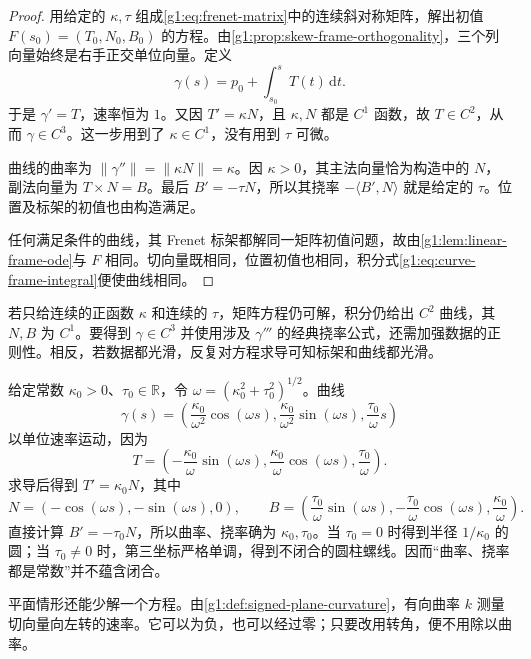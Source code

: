 \begin{proof}
	用给定的 \(\kappa,\tau\) 组成\eqref{g1:eq:frenet-matrix}中的连续斜对称矩阵，解出初值 \(F(s_0)=(T_0,N_0,B_0)\) 的方程。由\cref{g1:prop:skew-frame-orthogonality}，三个列向量始终是右手正交单位向量。定义
	\begin{equation}
		\label{g1:eq:curve-frame-integral}
		\gamma(s)=p_0+\int_{s_0}^s T(t)\,\mathrm{d}t.
	\end{equation}
	于是 \(\gamma'=T\)，速率恒为 \(1\)。又因 \(T'=\kappa N\)，且 \(\kappa,N\) 都是 \(C^1\) 函数，故 \(T\in C^2\)，从而 \(\gamma\in C^3\)。这一步用到了 \(\kappa\in C^1\)，没有用到 \(\tau\) 可微。

	曲线的曲率为 \(\lVert\gamma''\rVert=\lVert\kappa N\rVert=\kappa\)。因 \(\kappa>0\)，其主法向量恰为构造中的 \(N\)，副法向量为 \(T\times N=B\)。最后 \(B'=-\tau N\)，所以其挠率 \(-\langle B',N\rangle\) 就是给定的 \(\tau\)。位置及标架的初值也由构造满足。

	任何满足条件的曲线，其 Frenet 标架都解同一矩阵初值问题，故由\cref{g1:lem:linear-frame-ode}与 \(F\) 相同。切向量既相同，位置初值也相同，积分式\eqref{g1:eq:curve-frame-integral}便使曲线相同。
\end{proof}

若只给连续的正函数 \(\kappa\) 和连续的 \(\tau\)，矩阵方程仍可解，积分仍给出 \(C^2\) 曲线，其 \(N,B\) 为 \(C^1\)。要得到 \(\gamma\in C^3\) 并使用涉及 \(\gamma'''\) 的经典挠率公式，还需加强数据的正则性。相反，若数据都光滑，反复对方程求导可知标架和曲线都光滑。

\begin{example}
	\label{g1:exm:constant-curvature-helix}
	给定常数 \(\kappa_0>0\)、\(\tau_0\in\mathbb R\)，令 \(\omega=(\kappa_0^2+\tau_0^2)^{1/2}\)。曲线
	\[
		\gamma(s)=\left(
			\frac{\kappa_0}{\omega^2}\cos(\omega s),
			\frac{\kappa_0}{\omega^2}\sin(\omega s),
			\frac{\tau_0}{\omega}s
		\right)
	\]
	以单位速率运动，因为
	\[
		T=\left(-\frac{\kappa_0}{\omega}\sin(\omega s),
		\frac{\kappa_0}{\omega}\cos(\omega s),\frac{\tau_0}{\omega}\right).
	\]
	求导后得到 \(T'=\kappa_0N\)，其中
	\[
		N=(-\cos(\omega s),-\sin(\omega s),0),\qquad
		B=\left(\frac{\tau_0}{\omega}\sin(\omega s),
		-\frac{\tau_0}{\omega}\cos(\omega s),\frac{\kappa_0}{\omega}\right).
	\]
	直接计算 \(B'=-\tau_0N\)，所以曲率、挠率确为 \(\kappa_0,\tau_0\)。当 \(\tau_0=0\) 时得到半径 \(1/\kappa_0\) 的圆；当 \(\tau_0\ne0\) 时，第三坐标严格单调，得到不闭合的圆柱螺线。因而“曲率、挠率都是常数”并不蕴含闭合。
\end{example}

平面情形还能少解一个方程。由\cref{g1:def:signed-plane-curvature}，有向曲率 \(k\) 测量切向量向左转的速率。它可以为负，也可以经过零；只要改用转角，便不用除以曲率。

